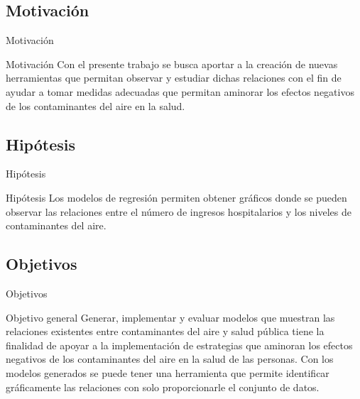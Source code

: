 \documentclass[11pt]{beamer}
\begin{document}
\subsection{Motivación}
\begin{frame}{Motivación}
\begin{block}{Motivación} \justifying
Con el presente trabajo se busca aportar a la creación de nuevas herramientas que permitan observar y estudiar dichas relaciones con el fin de ayudar a tomar medidas adecuadas que permitan aminorar los efectos negativos de los contaminantes del aire en la salud.
\end{block}
\end{frame}
\subsection{Hipótesis}
\begin{frame}{Hipótesis}
\begin{block}{Hipótesis} \justifying
Los modelos de regresión permiten obtener gráficos donde se pueden observar las relaciones entre el número de ingresos hospitalarios y los niveles de contaminantes del aire.
\end{block}
\end{frame}
\subsection{Objetivos}
\begin{frame}{Objetivos} 
\begin{block}{Objetivo general} \justifying
Generar, implementar y evaluar modelos que muestran las relaciones existentes entre contaminantes del aire y salud pública tiene la finalidad de apoyar a la implementación de estrategias que aminoran los efectos negativos de los contaminantes del aire en la salud de las personas. Con los modelos generados se puede tener una herramienta que permite identificar gráficamente las relaciones con solo proporcionarle el conjunto de datos.
\end{block}
\end{frame}
\end{document}
